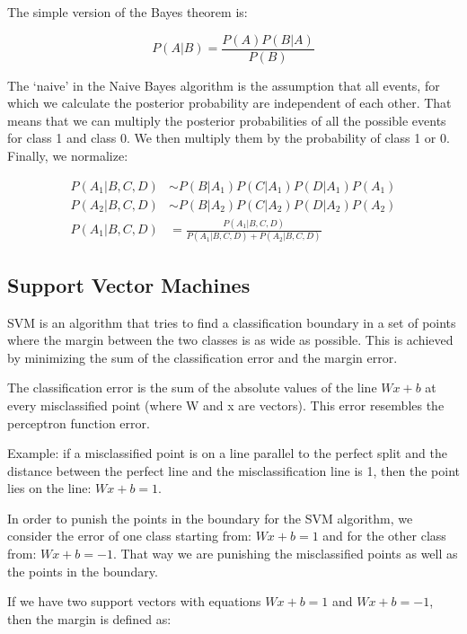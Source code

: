 \documentclass{article}
\begin{document}
The simple version of the Bayes theorem is:

\begin{equation}
  P(A|B) = \frac{P(A) P(B|A)}{P(B)}
\end{equation}

The ‘naive’ in the Naive Bayes algorithm is the assumption that all events, for which we calculate the posterior probability are independent of each other. That means that we can multiply the posterior probabilities of all the possible events for class 1 and class 0. We then multiply them by the probability of class 1 or 0. Finally, we normalize:

\begin{equation}
  \begin{aligned}
    P(A_1|B, C, D) &\sim P(B|A_1) P(C|A_1) P(D|A_1) P(A_1) \\
    P(A_2|B, C, D) &\sim P(B|A_2) P(C|A_2) P(D|A_2) P(A_2) \\
    P(A_1|B, C, D) &= \frac{P(A_1|B, C, D)}{P(A_1|B, C, D) + P(A_2|B, C, D)}
  \end{aligned}
\end{equation}

\subsection{Support Vector Machines}
SVM is an algorithm that tries to find a classification boundary in a set of points where the margin between the two classes is as wide as possible. This is achieved by minimizing the sum of the classification error and the margin error.

The classification error is the sum of the absolute values of the line $Wx + b$ at every misclassified point (where W and x are vectors). This error resembles the perceptron function error.

\begin{framed}
  Example: if a misclassified point is on a line parallel to the perfect split and the distance between the perfect line and the misclassification line is 1, then the point lies on the line: $Wx + b = 1$.
\end{framed}

In order to punish the points in the boundary for the SVM algorithm, we consider the error of one class starting from: $Wx + b = 1$ and for the other class from: $Wx + b = -1$. That way we are punishing the misclassified points as well as the points in the boundary.

If we have two support vectors with equations $Wx + b = 1$ and $Wx + b = -1$, then the margin is defined as:
\end{document}
